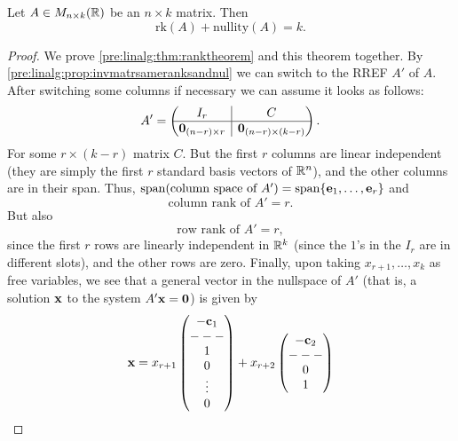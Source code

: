 \documentclass[10pt, a4paper]{article}
\begin{document}
\begin{theorem}
    Let $A \in M_{n \times k}(\mathbb{R})$ be an $n \times k$ matrix.
    Then
    \[
    \mathrm{rk}(A) + \mathrm{nullity}(A) = k.
    \]
    \begin{proof}
        We prove \autoref{pre:linalg:thm:ranktheorem} and this theorem together.
        By \autoref{pre:linalg:prop:invmatrsameranksandnul} we can switch to the RREF $A'$ of $A$.
        After switching some columns if necessary we can assume it looks as follows:
        \[
        A' = \left(\hspace{-5pt}\begin{array}{c|c}
             I_r & C  \\
             \hline
             \mathbf{0}_{(n - r)\times r} & \mathbf{0}_{(n - r) \times (k - r)}
        \end{array}\hspace{-5pt}\right).
        \]
        For some $r \times (k - r)$ matrix $C$.
        But the first $r$ columns are linear independent
        (they are simply the first $r$ standard basis vectors of $\mathbb{R} ^ n$),
        and the other columns are in their span.
        Thus,
        $\mathrm{span}(\text{column space of } A') = \mathrm{span}\{\mathbf{e}_1, \dotsc, \mathbf{e}_r\}$ and
        \[
        \text{column rank of } A' = r.
        \]
        But also
        \[
        \text{row rank of } A' = r,
        \]
        since the first $r$ rows are linearly independent in $\mathbb{R} ^ k$
        (since the $1$'s in the $I_r$ are in different slots),
        and the other rows are zero.
        Finally,
        upon taking $x_{r + 1}, \dotsc, x_k$ as free variables,
        we see that a general vector in the nullspace of $A'$
        (that is,
        a solution $\mathbf{x}$ to the system $A'\mathbf{x} = \mathbf{0}$)
        is given by
        \[
        \mathbf{x} = x_{r + 1}\begin{pmatrix}
            -\mathbf{c}_1 \\
            - - - \\
            1 \\
            0 \\
            \vdots \\
            0
        \end{pmatrix}
        + x_{r + 2}\begin{pmatrix}
            -\mathbf{c}_2 \\
            - - - \\
            0 \\
            1 \\

\end{pmatrix}\]
\end{proof}
\end{theorem}
\end{document}
